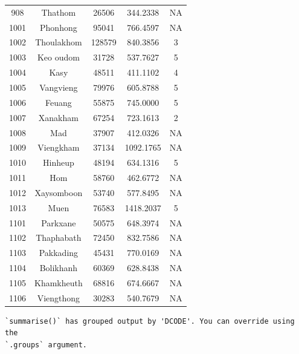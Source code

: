 \documentclass[
  letterpaper,
  DIV=11,
  numbers=noendperiod]{scrartcl}
\begin{document}
\begin{longtable}[]{@{}ccccc@{}}
908 & Thathom & 26506 & 344.2338 & NA \\
1001 & Phonhong & 95041 & 766.4597 & NA \\
1002 & Thoulakhom & 128579 & 840.3856 & 3 \\
1003 & Keo oudom & 31728 & 537.7627 & 5 \\
1004 & Kasy & 48511 & 411.1102 & 4 \\
1005 & Vangvieng & 79976 & 605.8788 & 5 \\
1006 & Feuang & 55875 & 745.0000 & 5 \\
1007 & Xanakham & 67254 & 723.1613 & 2 \\
1008 & Mad & 37907 & 412.0326 & NA \\
1009 & Viengkham & 37134 & 1092.1765 & NA \\
1010 & Hinheup & 48194 & 634.1316 & 5 \\
1011 & Hom & 58760 & 462.6772 & NA \\
1012 & Xaysomboon & 53740 & 577.8495 & NA \\
1013 & Muen & 76583 & 1418.2037 & 5 \\
1101 & Parkxane & 50575 & 648.3974 & NA \\
1102 & Thaphabath & 72450 & 832.7586 & NA \\
1103 & Pakkading & 45431 & 770.0169 & NA \\
1104 & Bolikhanh & 60369 & 628.8438 & NA \\
1105 & Khamkheuth & 68816 & 674.6667 & NA \\
1106 & Viengthong & 30283 & 540.7679 & NA \\
\end{longtable}

\begin{verbatim}
`summarise()` has grouped output by 'DCODE'. You can override using the
`.groups` argument.
\end{verbatim}
\end{document}
